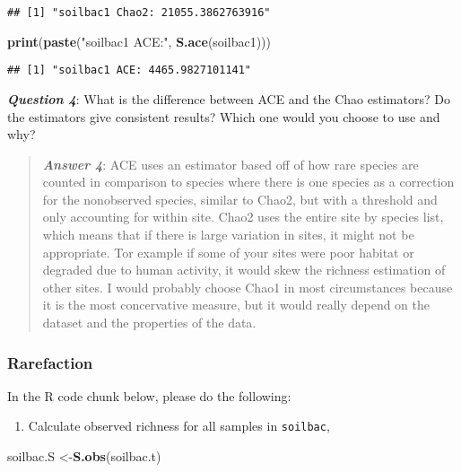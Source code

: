 \documentclass[
]{article}
\newenvironment{Shaded}{\begin{snugshade}}{\end{snugshade}}
\newcommand{\KeywordTok}[1]{\textcolor[rgb]{0.13,0.29,0.53}{\textbf{#1}}}
\newcommand{\NormalTok}[1]{#1}
\newcommand{\StringTok}[1]{\textcolor[rgb]{0.31,0.60,0.02}{#1}}
\providecommand{\tightlist}{%
  \setlength{\itemsep}{0pt}\setlength{\parskip}{0pt}}
\begin{document}
\begin{verbatim}
## [1] "soilbac1 Chao2: 21055.3862763916"
\end{verbatim}

\begin{Shaded}
\begin{Highlighting}[]
\KeywordTok{print}\NormalTok{(}\KeywordTok{paste}\NormalTok{(}\StringTok{"soilbac1 ACE:"}\NormalTok{,  }\KeywordTok{S.ace}\NormalTok{(soilbac1)))}
\end{Highlighting}
\end{Shaded}

\begin{verbatim}
## [1] "soilbac1 ACE: 4465.9827101141"
\end{verbatim}

\textbf{\emph{Question 4}}: What is the difference between ACE and the
Chao estimators? Do the estimators give consistent results? Which one
would you choose to use and why?

\begin{quote}
\textbf{\emph{Answer 4}}: ACE uses an estimator based off of how rare
species are counted in comparison to species where there is one species
as a correction for the nonobserved species, similar to Chao2, but with
a threshold and only accounting for within site. Chao2 uses the entire
site by species list, which means that if there is large variation in
sites, it might not be appropriate. Tor example if some of your sites
were poor habitat or degraded due to human activity, it would skew the
richness estimation of other sites. I would probably choose Chao1 in
most circumstances because it is the most concervative measure, but it
would really depend on the dataset and the properties of the data.
\end{quote}

\hypertarget{rarefaction}{%
\subsubsection{Rarefaction}\label{rarefaction}}

In the R code chunk below, please do the following:

\begin{enumerate}
\def\labelenumi{\arabic{enumi}.}
\tightlist
\item
  Calculate observed richness for all samples in \texttt{soilbac},
\end{enumerate}

\begin{Shaded}
\begin{Highlighting}[]
\NormalTok{soilbac.S <-}\KeywordTok{S.obs}\NormalTok{(soilbac.t)}
\end{Highlighting}
\end{Shaded}
\end{document}
